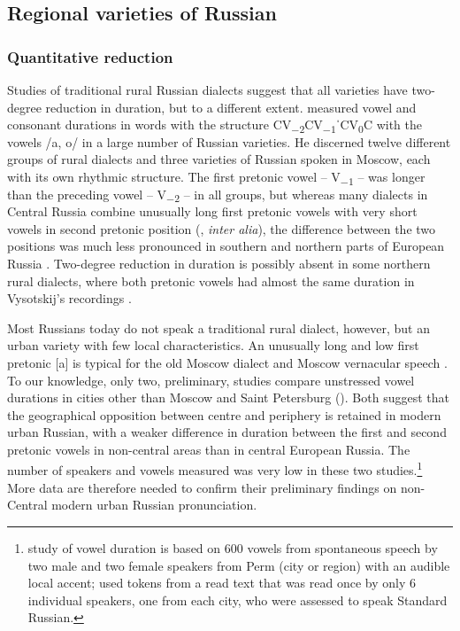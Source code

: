 \documentclass[output=paper,colorlinks,citecolor=black]{langscibook}
\begin{document}
\subsection{Regional varieties of Russian}\label{post:subsec:regional}
\subsubsection{Quantitative reduction}
\largerpage[-1]

Studies of traditional rural Russian dialects suggest that all varieties have two-degree reduction in duration, but to a different extent. \citet{Vysotskij1973} measured vowel and consonant durations in words with the structure CV\textsubscript{\tiny{$-2$}}CV\textsubscript{\tiny{$-1$}}ˈCV\textsubscript{\tiny{$0$}}C with the vowels /a, o/ in a large number of Russian varieties. He discerned twelve different groups of rural dialects and three varieties of Russian spoken in Moscow, each with its own rhythmic structure. The first pretonic vowel -- V\textsubscript{\tiny{$-1$}} -- was longer than the preceding vowel -- V\textsubscript{\tiny{$-2$}} -- in all groups, but whereas many dialects in Central Russia combine unusually long first pretonic vowels with very short vowels in second pretonic position (\citealt{Potebnja1866,Vysotskij1973,AlmuxamedovaKulsaripova1980}, \textit{inter alia}), the difference between the two positions was much less pronounced in southern and northern parts of European Russia \citep{Vysotskij1973}. Two-degree reduction in duration is possibly absent in some northern rural dialects, where both pretonic vowels had almost the same duration in Vysotskij’s recordings \citep{Vysotskij1973}.

Most Russians today do not speak a traditional rural dialect, however, but an urban variety with few local characteristics. An unusually long and low first pretonic [a] is typical for the old Moscow dialect and Moscow vernacular speech \citep{Vysotskij1973}. To our knowledge, only two, preliminary, studies compare unstressed vowel durations in cities other than Moscow and Saint Petersburg (\citealt{Erofeeva2005,GrammatcikovaEtAl2013}). Both suggest that the geographical opposition between centre and periphery is retained in modern urban Russian, with a weaker difference in duration between the first and second pretonic vowels in non-central areas than in central European Russia. The number of speakers and vowels measured was very low in these two studies.\footnote{ study of vowel duration is based on 600 vowels from spontaneous speech by two male and two female speakers from Perm (city or region) with an audible local accent; \citet{GrammatcikovaEtAl2013} used tokens from a read text that was read once by only 6 individual speakers, one from each city, who were assessed to speak Standard Russian.} More data are therefore needed to confirm their preliminary findings on non-Central modern urban Russian pronunciation.
\end{document}
